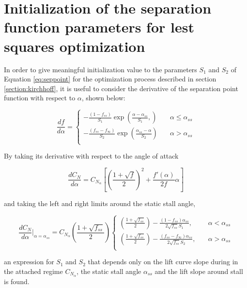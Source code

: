 \section{Initialization of the separation function parameters for lest squares optimization}


In order to give meaningful initialization value to the parameters $S_1$ and $S_2$ of Equation \eqref{eq:seppoint} for the optimization process described in section \ref{section:kirchhoff}, it is useful to consider the derivative of the separation point function with respect to $\alpha$, shown below:

\begin{equation} 
\frac{df}{d\alpha} = 
     \begin{cases}
       -\frac{(1-f_{ss})}{S_1}\exp(\frac{\alpha-\alpha_{ss}}{S_1},) &\quad \alpha \leq \alpha_{ss}\\
        -\frac{(f_{ss}-f_\infty)}{S_2}\exp(\frac{\alpha_{ss}-\alpha}{S_2}) &\quad \alpha > \alpha_{ss}\\
     \end{cases}
\end{equation}

By taking its derivative with respect to the angle of attack

\begin{equation}
\frac{dC_N}{d\alpha} = C_{N_{\alpha}} \left[\left(\frac{1+\sqrt{f}}{2}\right)^2+\frac{f'(\alpha)}{2f}\alpha \right]
\end{equation}

\noindent and taking the left and right limits around the static stall angle,

\begin{equation}
\frac{dC_N}{d\alpha}\Big|_{\alpha=\alpha_{ss}} = C_{N_\alpha}\left(\frac{1+\sqrt{f_{ss}}}{2}\right)
     \begin{cases}
      \left(\frac{1+\sqrt{f_{ss}}}{2}\right)-\frac{(1-f_{ss})\alpha_{ss}}{2\sqrt{f_{ss}}S_1},&\quad \alpha < \alpha_{ss}\\
        \left(\frac{1+\sqrt{f_{ss}}}{2}\right)-\frac{(f_{ss}-f_\infty)\alpha_{ss}}{2\sqrt{f_{ss}}S_2}, &\quad \alpha > \alpha_{ss}\\
     \end{cases}
\end{equation}

\noindent an expression for $S_1$ and $S_2$ that depends only on the lift curve slope during in the attached regime $C_{N_\alpha}$, the static stall angle $\alpha_{ss}$ and the lift slope around stall is found.

